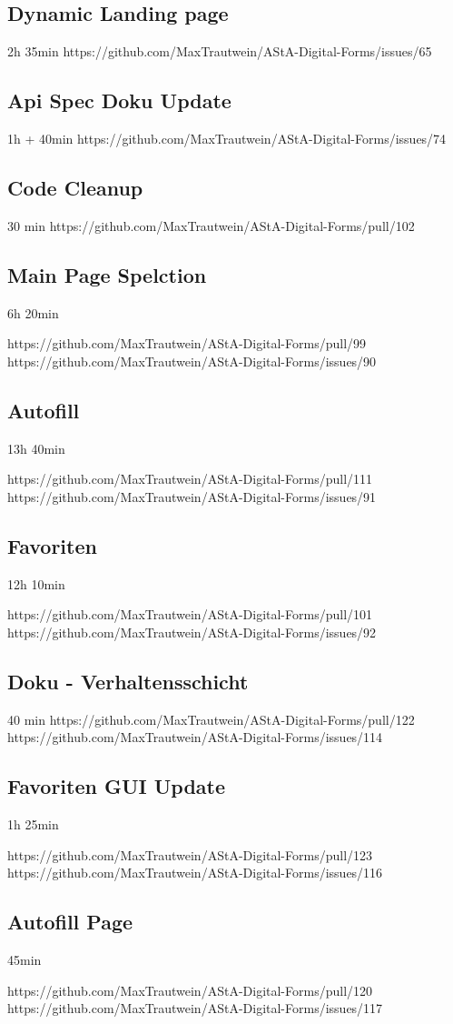 \subsection{Dynamic Landing page}
2h 35min
https://github.com/MaxTrautwein/AStA-Digital-Forms/issues/65
\subsection{Api Spec Doku Update}
1h + 40min
https://github.com/MaxTrautwein/AStA-Digital-Forms/issues/74
\subsection{Code Cleanup}
30 min
https://github.com/MaxTrautwein/AStA-Digital-Forms/pull/102
\subsection{Main Page Spelction}
6h 20min

https://github.com/MaxTrautwein/AStA-Digital-Forms/pull/99
https://github.com/MaxTrautwein/AStA-Digital-Forms/issues/90
\subsection{Autofill}
13h 40min

https://github.com/MaxTrautwein/AStA-Digital-Forms/pull/111
https://github.com/MaxTrautwein/AStA-Digital-Forms/issues/91
\subsection{Favoriten}
12h 10min

https://github.com/MaxTrautwein/AStA-Digital-Forms/pull/101
https://github.com/MaxTrautwein/AStA-Digital-Forms/issues/92
\subsection{Doku - Verhaltensschicht}
40 min
https://github.com/MaxTrautwein/AStA-Digital-Forms/pull/122
https://github.com/MaxTrautwein/AStA-Digital-Forms/issues/114

\subsection{Favoriten GUI Update}
1h 25min

https://github.com/MaxTrautwein/AStA-Digital-Forms/pull/123
https://github.com/MaxTrautwein/AStA-Digital-Forms/issues/116
\subsection{Autofill Page}
45min

https://github.com/MaxTrautwein/AStA-Digital-Forms/pull/120
https://github.com/MaxTrautwein/AStA-Digital-Forms/issues/117

